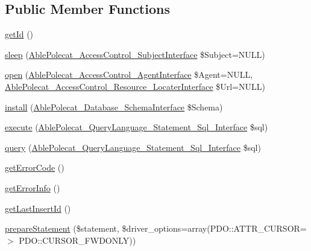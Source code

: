 \subsection*{Public Member Functions}
\begin{DoxyCompactItemize}
\item 
\hyperlink{class_able_polecat___database___pdo_a12251d0c022e9e21c137a105ff683f13}{get\+Id} ()
\item 
\hyperlink{class_able_polecat___database___pdo_a365e24d7b066205cafa2a5cce3a4f224}{sleep} (\hyperlink{interface_able_polecat___access_control___subject_interface}{Able\+Polecat\+\_\+\+Access\+Control\+\_\+\+Subject\+Interface} \$Subject=N\+U\+L\+L)
\item 
\hyperlink{class_able_polecat___database___pdo_a4ce5c2e3d8229d890939c780db9c8ba8}{open} (\hyperlink{interface_able_polecat___access_control___agent_interface}{Able\+Polecat\+\_\+\+Access\+Control\+\_\+\+Agent\+Interface} \$Agent=N\+U\+L\+L, \hyperlink{interface_able_polecat___access_control___resource___locater_interface}{Able\+Polecat\+\_\+\+Access\+Control\+\_\+\+Resource\+\_\+\+Locater\+Interface} \$Url=N\+U\+L\+L)
\item 
\hyperlink{class_able_polecat___database___pdo_aba618d13fc7fc2ddca23db57614cd14d}{install} (\hyperlink{interface_able_polecat___database___schema_interface}{Able\+Polecat\+\_\+\+Database\+\_\+\+Schema\+Interface} \$Schema)
\item 
\hyperlink{class_able_polecat___database___pdo_a2446b764608f23c472255a8e07076aff}{execute} (\hyperlink{interface_able_polecat___query_language___statement___sql___interface}{Able\+Polecat\+\_\+\+Query\+Language\+\_\+\+Statement\+\_\+\+Sql\+\_\+\+Interface} \$sql)
\item 
\hyperlink{class_able_polecat___database___pdo_a036b9fde55003e5c63dd6345b0f2a805}{query} (\hyperlink{interface_able_polecat___query_language___statement___sql___interface}{Able\+Polecat\+\_\+\+Query\+Language\+\_\+\+Statement\+\_\+\+Sql\+\_\+\+Interface} \$sql)
\item 
\hyperlink{class_able_polecat___database___pdo_a5f04b6f467dace4e4b9a81611e658c4d}{get\+Error\+Code} ()
\item 
\hyperlink{class_able_polecat___database___pdo_aa17a52a88134e9ba51a0731ba3ba4d6f}{get\+Error\+Info} ()
\item 
\hyperlink{class_able_polecat___database___pdo_aaf8e789036f518ea4523e095d1892e34}{get\+Last\+Insert\+Id} ()
\item 
\hyperlink{class_able_polecat___database___pdo_a374c56d08c9fb9b44796f1a55512b974}{prepare\+Statement} (\$statement, \$driver\+\_\+options=array(P\+D\+O\+::\+A\+T\+T\+R\+\_\+\+C\+U\+R\+S\+O\+R=$>$ P\+D\+O\+::\+C\+U\+R\+S\+O\+R\+\_\+\+F\+W\+D\+O\+N\+L\+Y))

\end{DoxyCompactItemize}
